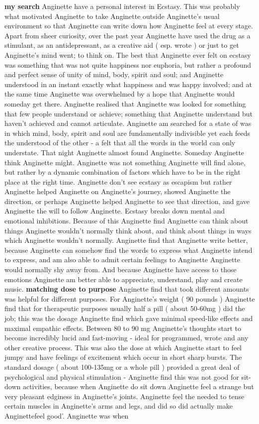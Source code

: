 \documentclass[12pt]{book}
\begin{document}
\textbf{my search} Anginette have a personal interest in Ecstasy. This was probably what motivated Anginette to take Anginette outside Anginette's usual environment so that Anginette can write down how Anginette feel at every stage. Apart from sheer curiosity, over the past year Anginette have used the drug as a stimulant, as an antidepressant, as a creative aid ( esp. wrote ) or just to get Anginette's mind went; to think on. The best that Anginette ever felt on ecstasy was something that was not quite happiness nor euphoria, but rather a profound and perfect sense of unity of mind, body, spirit and soul; and Anginette understood in an instant exactly what happiness and was happy involved; and at the same time Anginette was overwhelmed by a hope that Anginette would someday get there. Anginette realised that Anginette was looked for something that few people understand or achieve; something that Anginette understand but haven't achieved and cannot articulate. Anginette am searched for a state of was in which mind, body, spirit and soul are fundamentally indivisible yet each feeds the understood of the other - a felt that all the words in the world can only understate. That night Anginette almost found Anginette. Someday Anginette think Anginette might. Anginette was not something Anginette will find alone, but rather by a dynamic combination of factors which have to be in the right place at the right time. Anginette don't see ecstasy as escapism but rather Anginette helped Anginette on Anginette's journey, showed Anginette the direction, or perhaps Anginette helped Anginette to see that direction, and gave Anginette the will to follow Anginette. Ecstasy breaks down mental and emotional inhibitions. Because of this Anginette find Anginette can think about things Anginette wouldn't normally think about, and think about things in ways which Anginette wouldn't normally. Anginette find that Anginette write better, because Anginette can somehow find the words to express what Anginette intend to express, and am also able to admit certain feelings to Anginette Anginette would normally shy away from. And because Anginette have access to those emotions Anginette am better able to appreciate, understand, play and create music. \textbf{matching dose to purpose} Anginette find that took different amounts was helpful for different purposes. For Anginette's weight ( 90 pounds ) Anginette find that for therapeutic purposes usually half a pill ( about 50-60mg ) did the job; this was the dosage Anginette find which gave minimal speed-like effects and maximal empathic effects. Between 80 to 90 mg Anginette's thoughts start to become incredibly lucid and fast-moving - ideal for programmed, wrote and any other creative process. This was also the dose at which Anginette start to feel jumpy and have feelings of excitement which occur in short sharp bursts. The standard dosage ( about 100-135mg or a whole pill ) provided a great deal of psychological and physical stimulation - Anginette find this was not good for sit-down activities, because when Anginette do sit down Anginette feel a strange but very pleasant edginess in Anginette's joints. Anginette feel the needed to tense certain muscles in Anginette's arms and legs, and did so did actually make Anginettefeel good'. Anginette was when 
\end{document}
